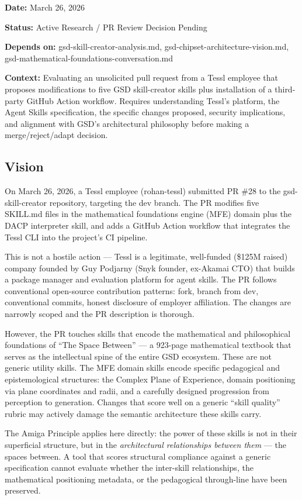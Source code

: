 \documentclass[11pt,letterpaper]{article}
\newcommand{\metafield}[2]{\textbf{\sffamily #1} #2\par}
\begin{document}
\metafield{Date:}{March 26, 2026}
\metafield{Status:}{Active Research / PR Review Decision Pending}
\metafield{Depends on:}{gsd-skill-creator-analysis.md, gsd-chipset-architecture-vision.md, gsd-mathematical-foundations-conversation.md}
\metafield{Context:}{Evaluating an unsolicited pull request from a Tessl employee that proposes modifications to five GSD skill-creator skills plus installation of a third-party GitHub Action workflow. Requires understanding Tessl's platform, the Agent Skills specification, the specific changes proposed, security implications, and alignment with GSD's architectural philosophy before making a merge/reject/adapt decision.}

\subsection{Vision}

On March 26, 2026, a Tessl employee (rohan-tessl) submitted PR \#28 to the gsd-skill-creator repository, targeting the dev branch. The PR modifies five SKILL.md files in the mathematical foundations engine (MFE) domain plus the DACP interpreter skill, and adds a GitHub Action workflow that integrates the Tessl CLI into the project's CI pipeline.

This is not a hostile action --- Tessl is a legitimate, well-funded (\$125M raised) company founded by Guy Podjarny (Snyk founder, ex-Akamai CTO) that builds a package manager and evaluation platform for agent skills. The PR follows conventional open-source contribution patterns: fork, branch from dev, conventional commits, honest disclosure of employer affiliation. The changes are narrowly scoped and the PR description is thorough.

However, the PR touches skills that encode the mathematical and philosophical foundations of ``The Space Between'' --- a 923-page mathematical textbook that serves as the intellectual spine of the entire GSD ecosystem. These are not generic utility skills. The MFE domain skills encode specific pedagogical and epistemological structures: the Complex Plane of Experience, domain positioning via plane coordinates and radii, and a carefully designed progression from perception to generation. Changes that score well on a generic ``skill quality'' rubric may actively damage the semantic architecture these skills carry.

The Amiga Principle applies here directly: the power of these skills is not in their superficial structure, but in the \emph{architectural relationships between them} --- the spaces between. A tool that scores structural compliance against a generic specification cannot evaluate whether the inter-skill relationships, the mathematical positioning metadata, or the pedagogical through-line have been preserved.
\end{document}
